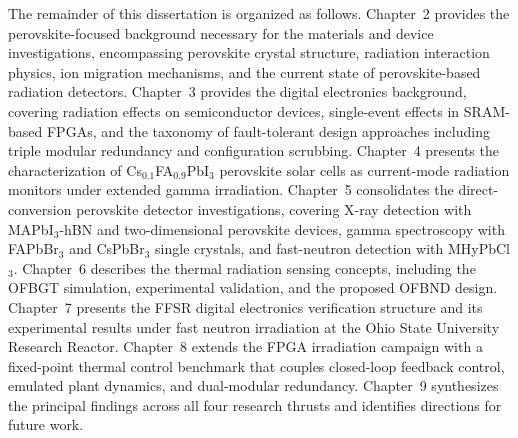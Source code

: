The remainder of this dissertation is organized as follows. Chapter~2
provides the perovskite-focused background necessary for the materials and
device investigations, encompassing perovskite crystal structure, radiation
interaction physics, ion migration mechanisms, and the current state of
perovskite-based radiation detectors. Chapter~3 provides the digital
electronics background, covering radiation effects on semiconductor devices,
single-event effects in SRAM-based FPGAs, and the taxonomy of fault-tolerant
design approaches including triple modular redundancy and configuration
scrubbing.  Chapter~4 presents the characterization of
Cs$_{0.1}$FA$_{0.9}$PbI$_3$ perovskite solar cells as current-mode
radiation monitors under extended gamma irradiation.  Chapter~5
consolidates the direct-conversion perovskite detector investigations,
covering X-ray detection with MAPbI$_3$-hBN and two-dimensional
perovskite devices, gamma spectroscopy with FAPbBr$_3$ and CsPbBr$_3$
single crystals, and fast-neutron detection with MHyPbCl$_3$.  Chapter~6
describes the thermal radiation sensing concepts, including the OFBGT
simulation, experimental validation, and the proposed OFBND design.
Chapter~7 presents the FFSR digital electronics verification structure
and its experimental results under fast neutron irradiation at the Ohio
State University Research Reactor.  Chapter~8 extends the FPGA
irradiation campaign with a fixed-point thermal control benchmark that
couples closed-loop feedback control, emulated plant dynamics, and
dual-modular redundancy.  Chapter~9 synthesizes the principal findings
across all four research thrusts and identifies directions for future
work.
